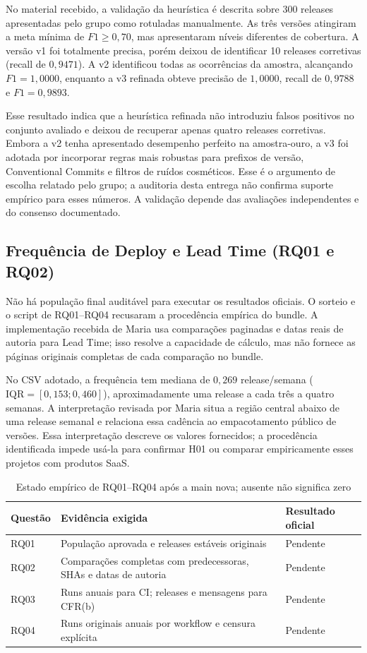 \documentclass[12pt]{article}
\begin{document}
No material recebido, a validação da heurística é descrita sobre 300 releases apresentadas pelo grupo como rotuladas manualmente. As três versões atingiram a meta mínima de $F1 \ge 0{,}70$, mas apresentaram níveis diferentes de cobertura. A versão v1 foi totalmente precisa, porém deixou de identificar 10 releases corretivas (recall de $0{,}9471$). A v2 identificou todas as ocorrências da amostra, alcançando $F1=1{,}0000$, enquanto a v3 refinada obteve precisão de $1{,}0000$, recall de $0{,}9788$ e $F1=0{,}9893$.

Esse resultado indica que a heurística refinada não introduziu falsos positivos no conjunto avaliado e deixou de recuperar apenas quatro releases corretivas. Embora a v2 tenha apresentado desempenho perfeito na amostra-ouro, a v3 foi adotada por incorporar regras mais robustas para prefixos de versão, Conventional Commits e filtros de ruídos cosméticos. Esse é o argumento de escolha relatado pelo grupo; a auditoria desta entrega não confirma suporte empírico para esses números. A validação depende das avaliações independentes e do consenso documentado.

\subsection{Frequência de Deploy e Lead Time (RQ01 e RQ02)}
Não há população final auditável para executar os resultados oficiais. O sorteio e o script de RQ01--RQ04 recusaram a procedência empírica do bundle. A implementação recebida de Maria usa comparações paginadas e datas reais de autoria para Lead Time; isso resolve a capacidade de cálculo, mas não fornece as páginas originais completas de cada comparação no bundle.

No CSV adotado, a frequência tem mediana de $0{,}269$ release/semana ($\text{IQR}=[0{,}153;0{,}460]$), aproximadamente uma release a cada três a quatro semanas. A interpretação revisada por Maria situa a região central abaixo de uma release semanal e relaciona essa cadência ao empacotamento público de versões. Essa interpretação descreve os valores fornecidos; a procedência identificada impede usá-la para confirmar H01 ou comparar empiricamente esses projetos com produtos SaaS.

\begin{table}[ht]
\centering
\caption{Estado empírico de RQ01--RQ04 após a main nova; ausente não significa zero}
\label{tab:resumo_metricas}
\small
\begin{tabularx}{\textwidth}{lXX}
\toprule
Questão & Evidência exigida & Resultado oficial \\
\midrule
RQ01 & População aprovada e releases estáveis originais & Pendente \\
RQ02 & Comparações completas com predecessoras, SHAs e datas de autoria & Pendente \\
RQ03 & Runs anuais para CI; releases e mensagens para CFR(b) & Pendente \\
RQ04 & Runs originais anuais por workflow e censura explícita & Pendente \\
\bottomrule
\end{tabularx}
\end{table}
\end{document}
